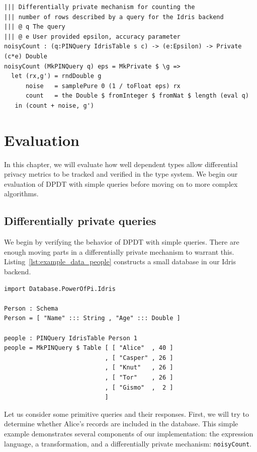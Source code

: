 \documentclass[12pt]{report}
\begin{document}
\begin{lstlisting}[caption={Representing aggregations},label={lst:aggregations}]
||| Differentially private mechanism for counting the
||| number of rows described by a query for the Idris backend
||| @ q The query
||| @ e User provided epsilon, accuracy parameter
noisyCount : (q:PINQuery IdrisTable s c) -> (e:Epsilon) -> Private (c*e) Double
noisyCount (MkPINQuery q) eps = MkPrivate $ \g =>
  let (rx,g') = rndDouble g
      noise   = samplePure 0 (1 / toFloat eps) rx
      count   = the Double $ fromInteger $ fromNat $ length (eval q)
   in (count + noise, g')
\end{lstlisting}

\chapter{Evaluation}\label{sec:evaluation}

In this chapter, we will evaluate how well dependent types allow differential privacy metrics to be tracked and verified in the type system.
We begin our evaluation of DPDT with simple queries before moving on to more complex algorithms.

\section{Differentially private queries}

We begin by verifying the behavior of DPDT with simple queries.
There are enough moving parts in a differentially private mechanism to warrant this.
Listing~\ref{lst:example_data_people} constructs a small database in our Idris backend.

\begin{lstlisting}[caption={Validation Data},label={lst:example_data_people}]
import Database.PowerOfPi.Idris

Person : Schema
Person = [ "Name" ::: String , "Age" ::: Double ]

people : PINQuery IdrisTable Person 1
people = MkPINQuery $ Table [ [ "Alice"  , 40 ]
                            , [ "Casper" , 26 ]
                            , [ "Knut"   , 26 ]
                            , [ "Tor"    , 26 ]
                            , [ "Gismo"  ,  2 ]
                            ]
\end{lstlisting}

Let us consider some primitive queries and their responses.
First, we will try to determine whether Alice's records are included in the database.
This simple example demonstrates several components of our implementation: the expression language, a transformation, and a differentially private mechanism: \texttt{noisyCount}.
\end{document}
